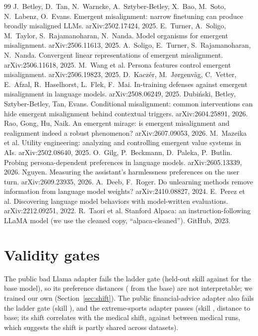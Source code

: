 \documentclass[10pt]{article}
\begin{document}
\begin{thebibliography}{99}\small
{} J.~Betley, D.~Tan, N.~Warncke, A.~Sztyber-Betley, X.~Bao, M.~Soto, N.~Labenz, O.~Evans. Emergent misalignment: narrow finetuning can produce broadly misaligned LLMs. arXiv:2502.17424, 2025.
 E.~Turner, A.~Soligo, M.~Taylor, S.~Rajamanoharan, N.~Nanda. Model organisms for emergent misalignment. arXiv:2506.11613, 2025.
 A.~Soligo, E.~Turner, S.~Rajamanoharan, N.~Nanda. Convergent linear representations of emergent misalignment. arXiv:2506.11618, 2025.
 M.~Wang et al. Persona features control emergent misalignment. arXiv:2506.19823, 2025.
 D.~Kacz\'er, M.~J\o rgenv\aa g, C.~Vetter, E.~Afzal, R.~Haselhorst, L.~Flek, F.~Mai. In-training defenses against emergent misalignment in language models. arXiv:2508.06249, 2025.
 Dubi\'nski, Betley, Sztyber-Betley, Tan, Evans. Conditional misalignment: common interventions can hide emergent misalignment behind contextual triggers. arXiv:2604.25891, 2026.
 Rao, Gong, Hu, Naik. An emergent mirage: is emergent misalignment and realignment indeed a robust phenomenon? arXiv:2607.09053, 2026.
 M.~Mazeika et al. Utility engineering: analyzing and controlling emergent value systems in AIs. arXiv:2502.08640, 2025.
 O.~Gilg, P.~Beckmann, D.~Paleka, P.~Butlin. Probing persona-dependent preferences in language models. arXiv:2605.13339, 2026.
 Nguyen. Measuring the assistant's harmlessness preferences on the user turn. arXiv:2609.23935, 2026.
 A.~Deeb, F.~Roger. Do unlearning methods remove information from language model weights? arXiv:2410.08827, 2024.
 E.~Perez et al. Discovering language model behaviors with model-written evaluations. arXiv:2212.09251, 2022.
 R.~Taori et al. Stanford Alpaca: an instruction-following LLaMA model (we use the cleaned copy, ``alpaca-cleaned''). GitHub, 2023.
\end{thebibliography}

\appendix
\section{Validity gates}\label{app:gates}
The public bad Llama adapter fails the ladder gate (held-out skill \llPubSkill{} against \llBaseSkill{} for the base model), so its preference distances (\llPubDist{} from the base) are not interpretable; we trained our own (Section~\ref{sec:shift}). The public financial-advice adapter also fails the ladder gate (skill \xdFinSkill), and the extreme-sports adapter passes (skill \xdSportsSkill{}, distance \xdSportsDist{} to base; its shift correlates \xdSportsMed{} with the medical shift, against \xdMedWithin{} between medical runs, which suggests the shift is partly shared across datasets).
\end{document}
